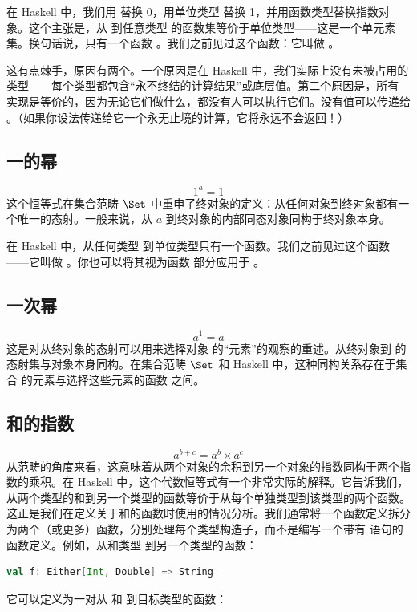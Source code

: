在 Haskell 中，我们用  替换 0，用单位类型 \code{()} 替换 1，并用函数类型替换指数对象。这个主张是，从  到任意类型  的函数集等价于单位类型——这是一个单元素集。换句话说，只有一个函数 。我们之前见过这个函数：它叫做 。

这有点棘手，原因有两个。一个原因是在 Haskell 中，我们实际上没有未被占用的类型——每个类型都包含“永不终结的计算结果”或底层值。第二个原因是，所有  实现是等价的，因为无论它们做什么，都没有人可以执行它们。没有值可以传递给 。（如果你设法传递给它一个永无止境的计算，它将永远不会返回！）

\subsection{一的幂}

\[1^{a} = 1\]
这个恒等式在集合范畴 $\Set$ 中重申了终对象的定义：从任何对象到终对象都有一个唯一的态射。一般来说，从 $a$ 到终对象的内部同态对象同构于终对象本身。

在 Haskell 中，从任何类型  到单位类型只有一个函数。我们之前见过这个函数——它叫做 。你也可以将其视为函数  部分应用于 \code{()}。

\subsection{一次幂}

\[a^{1} = a\]
这是对从终对象的态射可以用来选择对象  的“元素”的观察的重述。从终对象到  的态射集与对象本身同构。在集合范畴 $\Set$ 和 Haskell 中，这种同构关系存在于集合  的元素与选择这些元素的函数  之间。

\subsection{和的指数}

\[a^{b+c} = a^{b} \times a^{c}\]
从范畴的角度来看，这意味着从两个对象的余积到另一个对象的指数同构于两个指数的乘积。在 Haskell 中，这个代数恒等式有一个非常实际的解释。它告诉我们，从两个类型的和到另一个类型的函数等价于从每个单独类型到该类型的两个函数。这正是我们在定义关于和的函数时使用的情况分析。我们通常将一个函数定义拆分为两个（或更多）函数，分别处理每个类型构造子，而不是编写一个带有  语句的函数定义。例如，从和类型  到另一个类型的函数：

\begin{lstlisting}[language=Scala]
val f: Either[Int, Double] => String
\end{lstlisting}
它可以定义为一对从  和  到目标类型的函数：

